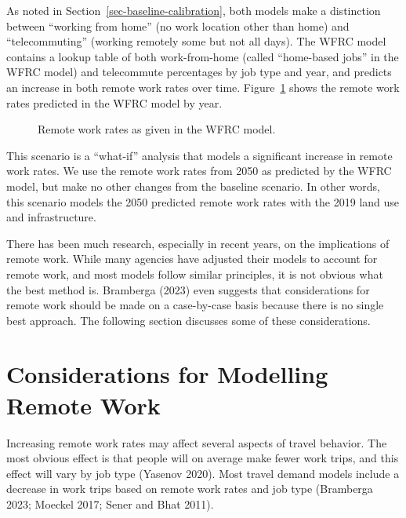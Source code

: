 \documentclass[fancy, oneside, mastersfancy, ms]{byuthesis}
\begin{document}
As noted in Section~\ref{sec-baseline-calibration}, both models make a
distinction between ``working from home'' (no work location other than
home) and ``telecommuting'' (working remotely some but not all days).
The WFRC model contains a lookup table of both work-from-home (called
``home-based jobs'' in the WFRC model) and telecommute percentages by
job type and year, and predicts an increase in both remote work rates
over time. Figure~\ref{fig-wfrc-remote-work-rate-plot} shows the remote
work rates predicted in the WFRC model by year.

\begin{figure}


\caption{\label{fig-wfrc-remote-work-rate-plot}Remote work rates as
given in the WFRC model.}

\end{figure}%

This scenario is a ``what-if'' analysis that models a significant
increase in remote work rates. We use the remote work rates from 2050 as
predicted by the WFRC model, but make no other changes from the baseline
scenario. In other words, this scenario models the 2050 predicted remote
work rates with the 2019 land use and infrastructure.

There has been much research, especially in recent years, on the
implications of remote work. While many agencies have adjusted their
models to account for remote work, and most models follow similar
principles, it is not obvious what the best method is. Bramberga (2023)
even suggests that considerations for remote work should be made on a
case-by-case basis because there is no single best approach. The
following section discusses some of these considerations.

\section{Considerations for Modelling Remote
Work}\label{sec-remote-work-considerations}

Increasing remote work rates may affect several aspects of travel
behavior. The most obvious effect is that people will on average make
fewer work trips, and this effect will vary by job type (Yasenov 2020).
Most travel demand models include a decrease in work trips based on
remote work rates and job type (Bramberga 2023; Moeckel 2017; Sener and
Bhat 2011).
\end{document}
